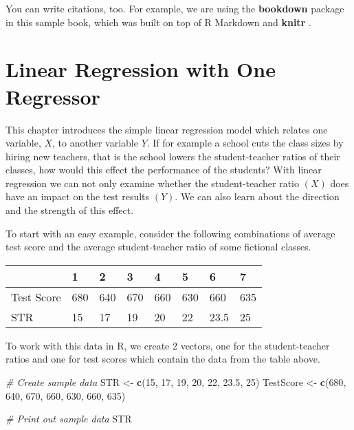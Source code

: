 \documentclass[]{book}
\newenvironment{Shaded}{\begin{snugshade}}{\end{snugshade}}
\newcommand{\KeywordTok}[1]{\textcolor[rgb]{0.13,0.29,0.53}{\textbf{#1}}}
\newcommand{\DecValTok}[1]{\textcolor[rgb]{0.00,0.00,0.81}{#1}}
\newcommand{\FloatTok}[1]{\textcolor[rgb]{0.00,0.00,0.81}{#1}}
\newcommand{\StringTok}[1]{\textcolor[rgb]{0.31,0.60,0.02}{#1}}
\newcommand{\CommentTok}[1]{\textcolor[rgb]{0.56,0.35,0.01}{\textit{#1}}}
\newcommand{\NormalTok}[1]{#1}
\theoremstyle{definition}
\theoremstyle{definition}
\theoremstyle{definition}
\theoremstyle{remark}
\begin{document}
You can write citations, too. For example, we are using the
\textbf{bookdown} package \citep{R-bookdown} in this sample book, which
was built on top of R Markdown and \textbf{knitr} \citep{xie2015}.

\chapter{Linear Regression with One
Regressor}\label{linear-regression-with-one-regressor}

This chapter introduces the simple linear regression model which relates
one variable, \(X\), to another variable \(Y\). If for example a school
cuts the class sizes by hiring new teachers, that is the school lowers
the student-teacher ratios of their classes, how would this effect the
performance of the students? With linear regression we can not only
examine whether the student-teacher ratio \(\left(X\right)\) does have
an impact on the test results \(\left(Y\right)\). We can also learn
about the direction and the strength of this effect.

To start with an easy example, consider the following combinations of
average test score and the average student-teacher ratio of some
fictional classes.

\begin{longtable}[]{@{}llllllll@{}}
\toprule
& 1 & 2 & 3 & 4 & 5 & 6 & 7\tabularnewline
\midrule
\endhead
Test Score & 680 & 640 & 670 & 660 & 630 & 660 & 635\tabularnewline
STR & 15 & 17 & 19 & 20 & 22 & 23.5 & 25\tabularnewline
\bottomrule
\end{longtable}

To work with this data in R, we create 2 vectors, one for the
student-teacher ratios and one for test scores which contain the data
from the table above.

\begin{Shaded}
\begin{Highlighting}[]
\CommentTok{# Create sample data}
\NormalTok{STR <-}\StringTok{ }\KeywordTok{c}\NormalTok{(}\DecValTok{15}\NormalTok{, }\DecValTok{17}\NormalTok{, }\DecValTok{19}\NormalTok{, }\DecValTok{20}\NormalTok{, }\DecValTok{22}\NormalTok{, }\FloatTok{23.5}\NormalTok{, }\DecValTok{25}\NormalTok{)}
\NormalTok{TestScore <-}\StringTok{ }\KeywordTok{c}\NormalTok{(}\DecValTok{680}\NormalTok{, }\DecValTok{640}\NormalTok{, }\DecValTok{670}\NormalTok{, }\DecValTok{660}\NormalTok{, }\DecValTok{630}\NormalTok{, }\DecValTok{660}\NormalTok{, }\DecValTok{635}\NormalTok{) }

\CommentTok{# Print out sample data}
\NormalTok{STR}
\end{Highlighting}
\end{Shaded}
\end{document}
